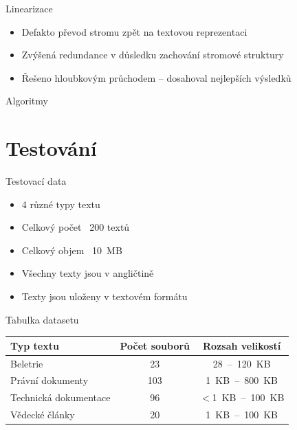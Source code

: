 \documentclass[lualatex,hyperref={pdfencoding=auto}]{beamer}
\begin{document}
\begin{frame}{Linearizace}
  \begin{itemize}
    \item Defakto převod stromu zpět na textovou reprezentaci
    \item Zvýšená redundance v důsledku zachování stromové struktury
    \item Řešeno hloubkovým průchodem -- dosahoval nejlepších výsledků    
  \end{itemize}
\end{frame}

\begin{frame}{Algoritmy}
\end{frame}

\section{Testování}

\begin{frame}{Testovací data}
      \begin{itemize}
        \item 4 různé typy textu
        \item Celkový počet ~200 textů
        \item Celkový objem ~10~MB
        \item Všechny texty jsou v angličtině
        \item Texty jsou uloženy v textovém formátu
      \end{itemize}
    \begin{block}{Tabulka datasetu}
    \begin{table}[ht]
      \centering
      \begin{tabular}{|l|c|c|}
        \hline
        \textbf{Typ textu} & \textbf{Počet souborů} & \textbf{Rozsah velikostí} \\
        \hline
        Beletrie & 23 & 28~--~120~KB \\
        Právní dokumenty & 103 & 1~KB~--~800~KB \\
        Technická dokumentace & 96 & $<$1~KB~--~100~KB \\
        Vědecké články & 20 & 1~KB~--~100~KB \\
        \hline
      \end{tabular}
    \end{table}
    \end{block}
\end{frame}
\end{document}
